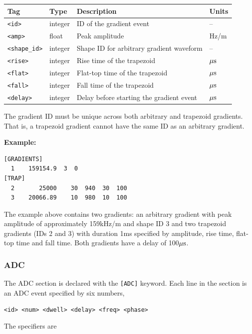 \documentclass{article}
\begin{document}
\begin{tabularx}{\textwidth}{llXl}
\toprule
Tag & Type & Description & Units\\
\midrule
\verb.<id>. & integer & ID of the gradient event & -- \\
\verb.<amp>. & float & Peak amplitude & Hz/m \\
\verb.<shape_id>. & integer & Shape ID for arbitrary gradient waveform & -- \\
\verb.<rise>. & integer & Rise time of the trapezoid & $\rm \mu s$ \\
\verb.<flat>. & integer & Flat-top time of the trapezoid & $\rm \mu s$ \\
\verb.<fall>. & integer & Fall time of the trapezoid & $\rm \mu s$ \\
\verb.<delay>. & integer & Delay before starting the gradient event & $\rm \mu s$\\
\bottomrule
\end{tabularx}

The gradient ID must be unique across both arbitrary and trapezoid gradients. That is, a trapezoid gradient cannot have the same ID as an arbitrary gradient.


\begin{minipage}{\textwidth}
\textbf{Example:}
\begin{lstlisting}
[GRADIENTS]
  1    159154.9  3  0
[TRAP]
  2       25000    30  940  30  100
  3    20066.89    10  980  10  100
\end{lstlisting}
\end{minipage}

The example above contains two gradients: an arbitrary gradient with peak amplitude of approximately 159kHz/m and shape ID 3 and two trapezoid gradients (IDs 2 and 3) with duration 1ms specified by amplitude, rise time, flat-top time and fall time.
Both gradients have a delay of 100$\rm \mu s$.

\subsubsection{ADC}
The ADC section is declared with the \verb.[ADC]. keyword. Each line in the section is an ADC event specified by six numbers,
\begin{lstlisting}
<id> <num> <dwell> <delay> <freq> <phase>
\end{lstlisting}

The specifiers are
\end{document}
